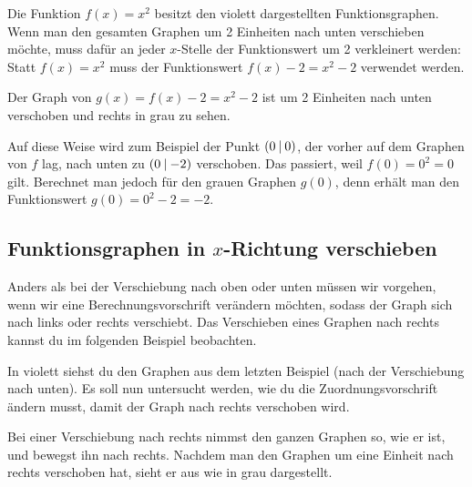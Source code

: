 \documentclass[../../main.tex]{subfiles}
\begin{document}
\begin{example}{}

    Die Funktion $f(x)=x^2$ besitzt den violett dargestellten Funktionsgraphen. Wenn man den gesamten Graphen um 2 Einheiten nach unten verschieben möchte, muss dafür an jeder $x$-Stelle der Funktionswert um 2 verkleinert werden: Statt $f(x)=x^2$ muss der Funktionswert $f(x)-2=x^2-2$ verwendet werden. 
    
    Der Graph von $g(x)=f(x)-2=x^2-2$ ist um 2 Einheiten nach unten verschoben und rechts in grau zu sehen.
    
    Auf diese Weise wird zum Beispiel der Punkt $\left(0 \:\middle|\: 0\right)$, der vorher auf dem Graphen von $f$ lag, nach unten zu $\left(0 \:\middle|\: -2\right)$ verschoben. Das passiert, weil $f(0)=0^2=0$ gilt. Berechnet man jedoch für den grauen Graphen $g(0)$, denn erhält man den Funktionswert \mbox{$g(0)=0^2-2=-2$}.
\end{example}

\subsection{Funktionsgraphen in $x$-Richtung verschieben}
\label{sec:abbildungen_verschieben_x}

Anders als bei der Verschiebung nach oben oder unten müssen wir vorgehen, wenn wir eine Berechnungsvorschrift verändern möchten, sodass der Graph sich nach links oder rechts verschiebt. Das Verschieben eines Graphen nach rechts kannst du im folgenden Beispiel beobachten.

\begin{example}{}
    
    In violett siehst du den Graphen aus dem letzten Beispiel (nach der Verschiebung nach unten). Es soll nun untersucht werden, wie du die Zuordnungsvorschrift ändern musst, damit der Graph nach rechts verschoben wird. 
    
    Bei einer Verschiebung nach rechts nimmst den ganzen Graphen so, wie er ist, und bewegst ihn nach rechts. Nachdem man den Graphen um eine Einheit nach rechts verschoben hat, sieht er aus wie in grau dargestellt.
\end{example}
\end{document}
